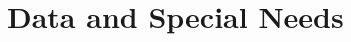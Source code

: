 \documentclass[12pt,a4paper]{article}
\begin{document}








\section{Data and Special Needs}
\label{sec:data}



















\end{document}
